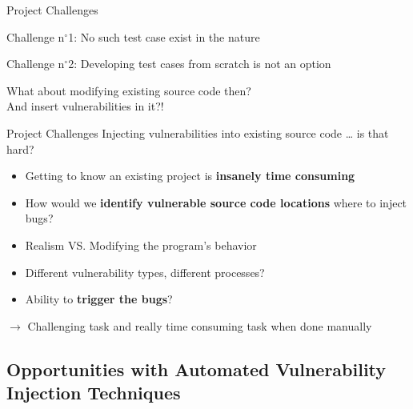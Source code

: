 \documentclass[aspectratio=169]{beamer}
\begin{document}
  \begin{frame}{Project Challenges}
    \begin{block}{Challenge n$^{\circ}$1:}
      No such test case exist in the nature
    \end{block}
    \pause
    \begin{block}{Challenge n$^{\circ}$2:}
      Developing test cases from scratch is not an option
    \end{block}
    \pause
    \vspace{1.5em}
    \centering
    \begin{LARGE}
      What about modifying existing source code then?\\ And \alert{insert vulnerabilities} in it?!
    \end{LARGE}
  \end{frame}

  \begin{frame}{Project Challenges}
    Injecting vulnerabilities into existing source code \ldots{} is that hard?\\
    \pause
    \begin{itemize}
    \setlength\itemsep{0.4em}
    \item Getting to know an existing project is \textbf{insanely time consuming}
    \pause
    \item How would we \textbf{identify vulnerable source code locations} where to inject bugs?
    \pause
    \item Realism VS. Modifying the program's behavior
    \pause
    \item Different vulnerability types, different processes?
    \pause
    \item Ability to \textbf{trigger the bugs}?
    \end{itemize}
    \pause
    \vspace{0.5em}
    $\rightarrow$ Challenging task and really {\LARGE\alert{time consuming}} task when done manually
  \end{frame}
  
  \subsection{Opportunities with Automated Vulnerability Injection Techniques}
\end{document}
